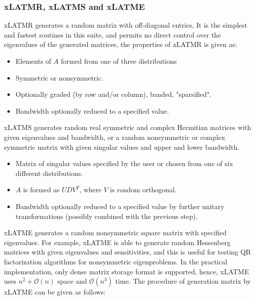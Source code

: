 \subsubsection{xLATMR, xLATMS and xLATME}

xLATMR generates a random matrix with off-diagonal entries,  It is the simplest and fastest routines in this suite, and permits no direct control over the eigenvalues of the generated matrices, the properties of xLATMR is given as:

\begin{itemize}
	\item Elements of $A$ formed from one of three distributions
	\item Symmetric or nonsymmetric.
	\item Optionally graded (by row and/or column), banded, "sparsified".
	\item Bandwidth optionally reduced to a specified value.
\end{itemize}

xLATMS generates random real symmetric and complex Hermitian matrices with given eigenvalues and bandwidth, or a random nonsymmetric or complex symmetric matrix with given singular values and upper and lower bandwidth.

\begin{itemize}
	\item Matrix of singular values specified by the user or chosen from one of six different distributions.
	\item $A$ is formed as $UDV^T$, where $V$ is random orthogonal.
	\item Bandwidth optionally reduced to a specified value by further unitary transformations (possibly combined with the previous step).
\end{itemize}

xLATME generates a random nonsymmetric square matrix with specified eigenvalues. For example, xLATME is able to generate random Hessenberg matrices with given eigenvalues and sensitivities, and this is useful for testing QR factorization algorithms for nonsymmetric eigenproblems. In the practical implementation, only dense matrix storage format is supported, hence, xLATME uses $n^2+\mathcal{O}(n)$ space and $\mathcal{O}(n^3)$ time. The procedure of generation matrix by xLATME can be given as follows:

